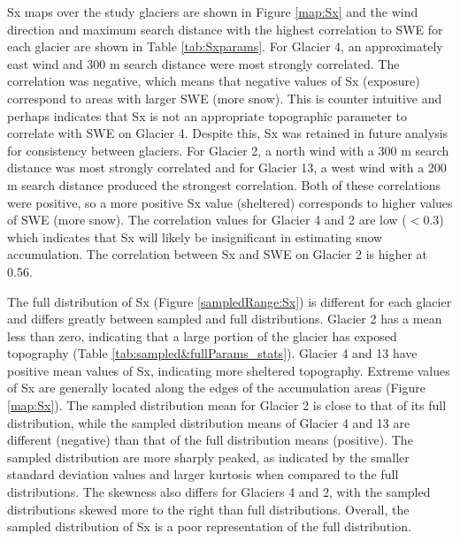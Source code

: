 \documentclass{sfuthesis}
\begin{document}
Sx maps over the study glaciers are shown in Figure \ref{map:Sx} and the wind direction and maximum search distance with the highest correlation to SWE for each glacier are shown in Table \ref{tab:Sxparams}. For Glacier 4, an approximately east wind and 300 m search distance were most strongly correlated. The correlation was negative, which means that negative values of Sx (exposure) correspond to areas with larger SWE (more snow). This is counter intuitive and perhaps indicates that Sx is not an appropriate topographic parameter to correlate with SWE on Glacier 4. Despite this, Sx was retained in future analysis for consistency between glaciers. For Glacier 2, a north wind with a 300 m search distance was most strongly correlated and for Glacier 13, a west wind with a 200 m search distance produced the strongest correlation. Both of these correlations were positive, so a more positive Sx value (sheltered) corresponds to higher values of SWE (more snow). The correlation values for Glacier 4 and 2 are low ($<$0.3) which indicates that Sx will likely be insignificant in estimating snow accumulation. The correlation between Sx and SWE on Glacier 2 is higher at 0.56. 

The full distribution of Sx (Figure \ref{sampledRange:Sx}) is different for each glacier and differs greatly between sampled and full distributions. Glacier 2 has a mean less than zero, indicating that a large portion of the glacier has exposed topography (Table \ref{tab:sampled&fullParams_stats}). Glacier 4 and 13 have positive mean values of Sx, indicating more sheltered topography. Extreme values of Sx are generally located along the edges of the accumulation areas (Figure \ref{map:Sx}). The sampled distribution mean for Glacier 2 is close to that of its full distribution, while the sampled distribution means of Glacier 4 and 13 are different (negative) than that of the full distribution means (positive). The sampled distribution are more sharply peaked, as indicated by the smaller standard deviation values and larger kurtosis when compared to the full distributions. The skewness also differs for Glaciers 4 and 2, with the sampled distributions skewed more to the right than full distributions. Overall, the sampled distribution of Sx is a poor representation of the full distribution. 
\end{document}
